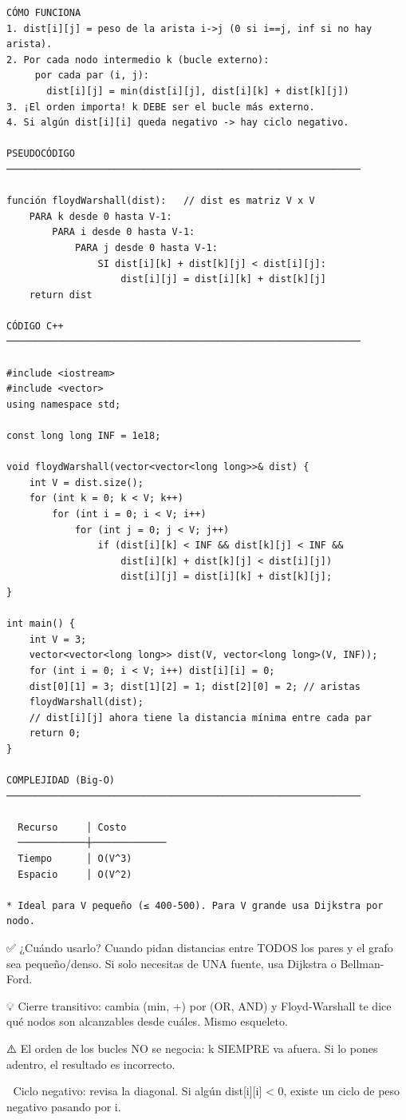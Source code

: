 \begin{lstlisting}
CÓMO FUNCIONA
1. dist[i][j] = peso de la arista i->j (0 si i==j, inf si no hay arista).
2. Por cada nodo intermedio k (bucle externo):
     por cada par (i, j):
       dist[i][j] = min(dist[i][j], dist[i][k] + dist[k][j])
3. ¡El orden importa! k DEBE ser el bucle más externo.
4. Si algún dist[i][i] queda negativo -> hay ciclo negativo.

PSEUDOCÓDIGO
──────────────────────────────────────────────────────────────

función floydWarshall(dist):   // dist es matriz V x V
    PARA k desde 0 hasta V-1:
        PARA i desde 0 hasta V-1:
            PARA j desde 0 hasta V-1:
                SI dist[i][k] + dist[k][j] < dist[i][j]:
                    dist[i][j] = dist[i][k] + dist[k][j]
    return dist

CÓDIGO C++
──────────────────────────────────────────────────────────────

#include <iostream>
#include <vector>
using namespace std;

const long long INF = 1e18;

void floydWarshall(vector<vector<long long>>& dist) {
    int V = dist.size();
    for (int k = 0; k < V; k++)
        for (int i = 0; i < V; i++)
            for (int j = 0; j < V; j++)
                if (dist[i][k] < INF && dist[k][j] < INF &&
                    dist[i][k] + dist[k][j] < dist[i][j])
                    dist[i][j] = dist[i][k] + dist[k][j];
}

int main() {
    int V = 3;
    vector<vector<long long>> dist(V, vector<long long>(V, INF));
    for (int i = 0; i < V; i++) dist[i][i] = 0;
    dist[0][1] = 3; dist[1][2] = 1; dist[2][0] = 2; // aristas
    floydWarshall(dist);
    // dist[i][j] ahora tiene la distancia mínima entre cada par
    return 0;
}

COMPLEJIDAD (Big-O)
──────────────────────────────────────────────────────────────

  Recurso     │ Costo
  ────────────┼─────────────
  Tiempo      │ O(V^3)
  Espacio     │ O(V^2)

* Ideal para V pequeño (≤ 400-500). Para V grande usa Dijkstra por nodo.
\end{lstlisting}

\begin{dsaentrevistas}

✅ ¿Cuándo usarlo? Cuando pidan distancias entre TODOS los pares y el
   grafo sea pequeño/denso. Si solo necesitas de UNA fuente, usa
   Dijkstra o Bellman-Ford.

💡 Cierre transitivo: cambia (min, +) por (OR, AND) y Floyd-Warshall te
   dice qué nodos son alcanzables desde cuáles. Mismo esqueleto.

⚠️ El orden de los bucles NO se negocia: k SIEMPRE va afuera. Si lo
   pones adentro, el resultado es incorrecto.

🔑 Ciclo negativo: revisa la diagonal. Si algún dist[i][i] < 0, existe
   un ciclo de peso negativo pasando por i.

\end{dsaentrevistas}

